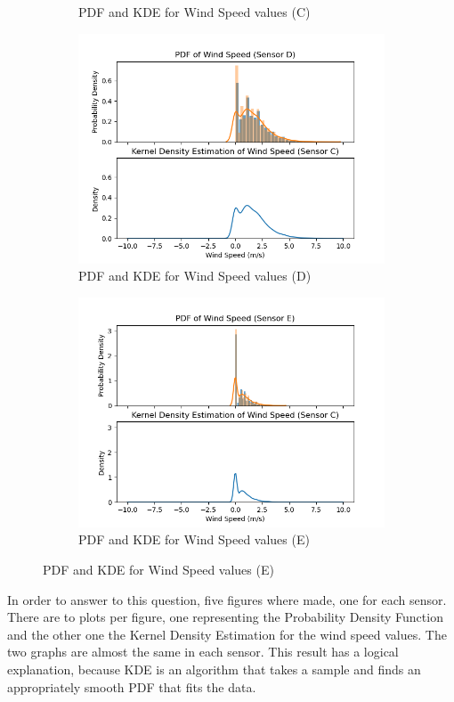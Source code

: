 \documentclass[a4paper,12pt]{article} %
\begin{document}
\begin{figure}[H]
\begin{subfigure}[b]{0.4\linewidth}
		\caption{PDF and KDE for Wind Speed values (C)}
	\end{subfigure}
	\begin{subfigure}[b]{0.4\linewidth}
		\includegraphics[width=0.9\linewidth]{Figure_13.png} 
		\caption{PDF and KDE for Wind Speed values (D)}
	\end{subfigure}
	\begin{subfigure}[b]{0.4\linewidth}
		\includegraphics[width=0.9\linewidth]{Figure_14.png} 
		\caption{PDF and KDE for Wind Speed values (E)}
	\end{subfigure}
\end{figure}

In order to answer to this question, five figures where made, one for each sensor. There are to plots per figure, one representing the Probability Density Function and the other one the Kernel Density Estimation for the wind speed values. The two graphs are almost the same in each sensor. This result has a logical explanation, because  KDE is an algorithm that takes a sample and finds an appropriately smooth PDF that fits the data. 
\end{document}
